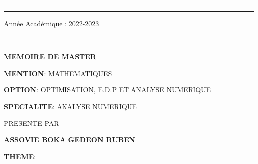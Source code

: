 \begin{spacing}{0.85}
	\rule{1\textwidth}{4 pt}
	
	\begin{minipage}{1\textwidth}
		\begin{minipage}{0.4\textwidth}
			\begin{center}
				\rule{0.005cm}{4 pt}
			\end{center}
		\end{minipage}
		\hfill
		\begin{minipage}{0.4\textwidth}
			\begin{center}
				{\selectfont%
					Année Académique : 2022-2023
				}
			\end{center}
		\end{minipage}\\
	\end{minipage}
	
	\begin{minipage}{1\textwidth}
		\begin{center}
			\textbf{MEMOIRE DE MASTER}
			\\
		\end{center}
		\begin{center}
			\textbf{MENTION}: MATHEMATIQUES\\
		\end{center}
		
		\begin{center}
			\textbf{OPTION}: OPTIMISATION, E.D.P ET ANALYSE NUMERIQUE\\
		\end{center}
		
		\begin{center}
			\textbf{SPECIALITE}: ANALYSE NUMERIQUE\\
		\end{center}
		\begin{center}
			PRESENTE PAR\\
		\end{center}
		\begin{center}
			\textbf{ASSOVIE BOKA GEDEON RUBEN}
			\\
		\end{center}
	\end{minipage}
	
	\begin{center}
		\underline{\textbf{THEME}}:
		\\
	\end{center}
	{\centering \qquad \setlength{\fboxsep}{1mm}
		\setlength{\fboxrule}{1mm}
		\par}
	

\end{spacing}
